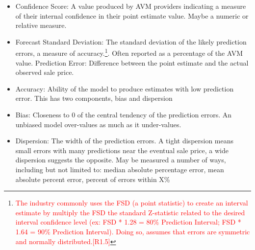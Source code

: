 \documentclass[colTwo]{anon}
\theoremstyle{definition}
\begin{document}
\begin{itemize}
\item Confidence Score: A value produced by AVM providers indicating a measure of their internal confidence in their point estimate value.  Maybe a numeric or relative measure. 
\item Forecast Standard Deviation:  The standard deviation of the likely prediction errors, a measure of accuracy.\footnote{\textcolor{red}{The industry commonly uses the FSD (a point statistic) to create an interval estimate by multiply the FSD the standard Z-statistic related to the desired interval confidence level (ex: FSD * 1.28 = 80\% Prediction Interval; FSD * 1.64 = 90\% Prediction Interval). Doing so, assumes that errors are symmetric and normally distributed.[R1.5]}}. Often reported as a percentage of the AVM value.  
Prediction Error: Difference between the point estimate and the actual observed sale price.
\item Accuracy: Ability of the model to produce estimates with low prediction error.  This has two components, bias and dispersion
\item Bias: Closeness to 0 of the central tendency of the prediction errors.  An unbiased model over-values as much as it under-values.  
\item Dispersion: The width of the prediction errors.  A tight dispersion means small errors with many predictions near the eventual sale price, a wide dispersion suggests the opposite.  May be measured a number of ways, including but not limited to: median absolute percentage error, mean absolute percent error, percent of errors within X\%
\end{itemize}
\end{document}
